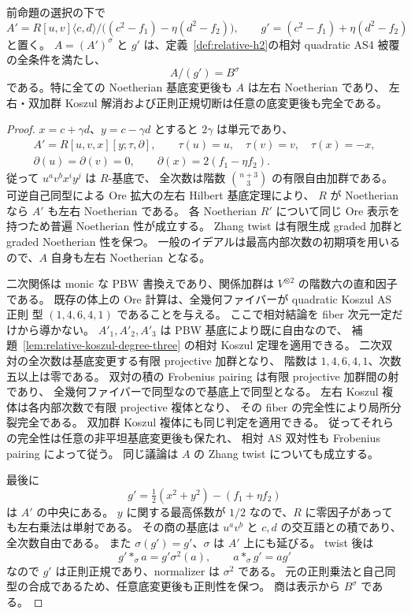 \begin{proposition}[全相対 AS4 条件]\label{prop:nc-full-relative-as4}
前命題の選択の下で
\[
 A'=R[u,v]\langle c,d\rangle/
 \bigl((c^2-f_1)-\eta(d^2-f_2)\bigr),\qquad
 g'=(c^2-f_1)+\eta(d^2-f_2)
\]
と置く。
$A=(A')^\sigma$ と $g'$ は、定義~\ref{def:relative-h2}の相対 quadratic AS4 被覆の全条件を満たし、
\[
 A/(g')=B^\sigma
\]
である。特に全ての Noetherian 基底変更後も $A$ は左右 Noetherian であり、
左右・双加群 Koszul 解消および正則正規切断は任意の底変更後も完全である。
\end{proposition}

\begin{proof}
$x=c+\gamma d$、$y=c-\gamma d$ とすると $2\gamma$ は単元であり、
\[
 \begin{gathered}
 A'=R[u,v,x][y;\tau,\partial],\qquad
 \tau(u)=u,\quad\tau(v)=v,\quad\tau(x)=-x,\\
 \partial(u)=\partial(v)=0,\qquad\partial(x)=2(f_1-\eta f_2).
 \end{gathered}
\]
従って $u^av^bx^iy^j$ は $R$-基底で、
全次数は階数 $\binom{n+3}{3}$ の有限自由加群である。
可逆自己同型による Ore 拡大の左右 Hilbert 基底定理により、
$R$ が Noetherian なら $A'$ も左右 Noetherian である。
各 Noetherian $R'$ について同じ Ore 表示を持つため普遍 Noetherian 性が成立する。
Zhang twist は有限生成 graded 加群と graded Noetherian 性を保つ。
一般のイデアルは最高内部次数の初期項を用いるので、$A$ 自身も左右 Noetherian となる。

二次関係は monic な PBW 書換えであり、関係加群は $V^{\otimes2}$ の階数六の直和因子である。
既存の体上の Ore 計算は、全幾何ファイバーが quadratic Koszul AS 正則
型 $(1,4,6,4,1)$ であることを与える。
ここで相対結論を fiber 次元一定だけから導かない。
$A'_1,A'_2,A'_3$ は PBW 基底により既に自由なので、
補題~\ref{lem:relative-koszul-degree-three} の相対 Koszul 定理を適用できる。
二次双対の全次数は基底変更する有限 projective 加群となり、
階数は $1,4,6,4,1$、次数五以上は零である。
双対の積の Frobenius pairing は有限 projective 加群間の射であり、
全幾何ファイバーで同型なので基底上で同型となる。
左右 Koszul 複体は各内部次数で有限 projective 複体となり、
その fiber の完全性により局所分裂完全である。
双加群 Koszul 複体にも同じ判定を適用できる。
従ってそれらの完全性は任意の非平坦基底変更後も保たれ、
相対 AS 双対性も Frobenius pairing によって従う。
同じ議論は $A$ の Zhang twist についても成立する。

最後に
\[
 g'=\tfrac12(x^2+y^2)-(f_1+\eta f_2)
\]
は $A'$ の中央にある。
$y$ に関する最高係数が $1/2$ なので、$R$ に零因子があっても左右乗法は単射である。
その商の基底は $u^av^b$ と $c,d$ の交互語との積であり、全次数自由である。
また $\sigma(g')=g'$、$\sigma$ は $A'$ 上にも延びる。
twist 後は
\[
 g'*_\sigma a=g'\sigma^2(a),\qquad a*_\sigma g'=ag'
\]
なので $g'$ は正則正規であり、normalizer は $\sigma^2$ である。
元の正則乗法と自己同型の合成であるため、任意底変更後も正則性を保つ。
商は表示から $B^\sigma$ である。
\end{proof}

